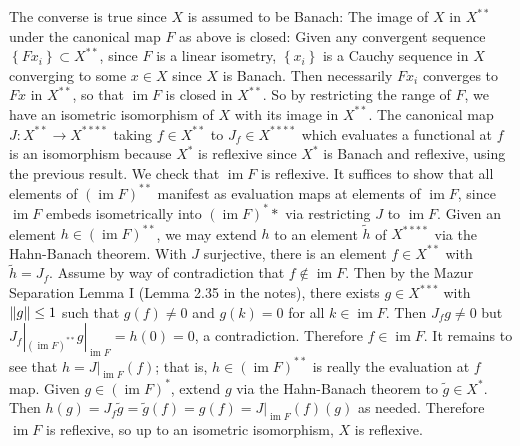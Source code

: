 \documentclass[11pt,leqno]{article}
\theoremstyle{plain}
\theoremstyle{definition}
\numberwithin{equation}{section}
\numberwithin{lem}{section}
\newcommand{\cbr}[1]{\left\{#1\right\}}
\DeclareMathOperator{\im}{im}
\begin{document}
\begin{enumerate}
  The converse is true since $X$ is assumed to be Banach: The image of $X$ in $X^{\ast\ast}$ under the canonical map $F$ as above is closed: Given any convergent sequence $\cbr{Fx_i}\subset X^{\ast\ast}$, since $F$ is a linear isometry, $\cbr{x_i}$ is a Cauchy sequence in $X$ converging to some $x\in X$ since $X$ is Banach. Then necessarily $Fx_i$ converges to $Fx$ in $X^{\ast\ast}$, so that $\im F$ is closed in $X^{\ast\ast}$.
  So by restricting the range of $F$, we have an isometric isomorphism of $X$ with its image in $X^{\ast\ast}$. The canonical map $J\colon X^{\ast\ast}\to X^{\ast\ast\ast\ast}$ taking $f\in X^{\ast\ast}$ to $J_f\in X^{\ast\ast\ast\ast}$ which evaluates a functional at $f$ is an isomorphism because $X^{\ast}$ is reflexive since $X^\ast$ is Banach and reflexive, using the previous result.
  We check that $\im F$ is reflexive.
  It suffices to show that all elements of $(\im F)^{\ast\ast}$ manifest as evaluation maps at elements of $\im F$, since $\im F$ embeds isometrically into $(\im F)^\ast\ast$ via restricting $J$ to $\im F$. Given an element $h\in (\im F)^{\ast\ast}$, we may extend $h$ to an element $\tilde h$ of $X^{\ast\ast\ast\ast}$ via the Hahn-Banach theorem. With $J$ surjective, there is an element $f\in X^{\ast\ast}$ with $\tilde h = J_f$. Assume by way of contradiction that $f\not\in \im F$. Then by the Mazur Separation Lemma I (Lemma 2.35 in the notes), there exists $g\in X^{\ast\ast\ast}$ with $\norm{g}\leq 1$ such that $g(f) \neq 0$ and $g(k) = 0$ for all $k\in \im F$. Then $J_fg \neq 0$ but $J_f|_{(\im F)^{\ast\ast}}g|_{\im F} = h(0) = 0$, a contradiction. Therefore $f\in \im F$. It remains to see that $h = J|_{\im F}(f)$; that is, $h\in (\im F)^{\ast\ast}$ is really the evaluation at $f$ map. Given $g\in (\im F)^\ast$, extend $g$ via the Hahn-Banach theorem to $\tilde g \in X^\ast$. Then $h(g) = J_f\tilde g = \tilde g(f) = g(f) = J|_{\im F}(f)(g)$ as needed.
  Therefore $\im F$ is reflexive, so up to an isometric isomorphism, $X$ is reflexive.
  

\end{enumerate}
\end{document}
